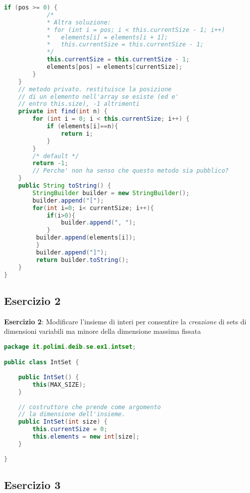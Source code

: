 \documentclass{article}
\begin{document}
\begin{lstlisting}[language=Java,escapechar=|]
    	if (pos >= 0) {
    	    /*
    	    * Altra soluzione:
    	    * for (int i = pos; i < this.currentSize - 1; i++)
    	    *	elements[i] = elements[i + 1];
    	    *	this.currentSize = this.currentSize - 1;
    	    */						
    	    this.currentSize = this.currentSize - 1;
    	    elements[pos] = elements[currentSize];
    	}
    }
    // metodo privato. restituisce la posizione
    // di un elemento nell'array se esiste (ed e'
    // entro this.size), -1 altrimenti
    private int find(int n) {
        for (int i = 0; i < this.currentSize; i++) {
            if (elements[i]==n){
                return i;
            }
        }
        /* default */
        return -1;
        // Perche' non ha senso che questo metodo sia pubblico?
    }
    public String toString() {
        StringBuilder builder = new StringBuilder();
        builder.append("[");
        for(int i=0; i< currentSize; i++){
            if(i>0){
                builder.append(", ");
            }
         builder.append(elements[i]);
         }
         builder.append("]");
         return builder.toString();
    }
}
\end{lstlisting}

\subsection{Esercizio 2}

\begin{framed}
\textbf{Esercizio 2}: Modificare l'insieme di interi per consentire la \emph{creazione} di sets di dimensioni variabili ma minore della dimensione massima fissata
\end{framed}


\begin{lstlisting}[language=Java,escapechar=|]
package it.polimi.deib.se.ex1.intset;

public class IntSet {
	
	public IntSet() {
		this(MAX_SIZE);
	}
	
	// costruttore che prende come argomento
	// la dimensione dell'insieme.
	public IntSet(int size) {
		this.currentSize = 0;
		this.elements = new int[size];
	}
	
}
\end{lstlisting}



\subsection{Esercizio 3}
\end{document}
